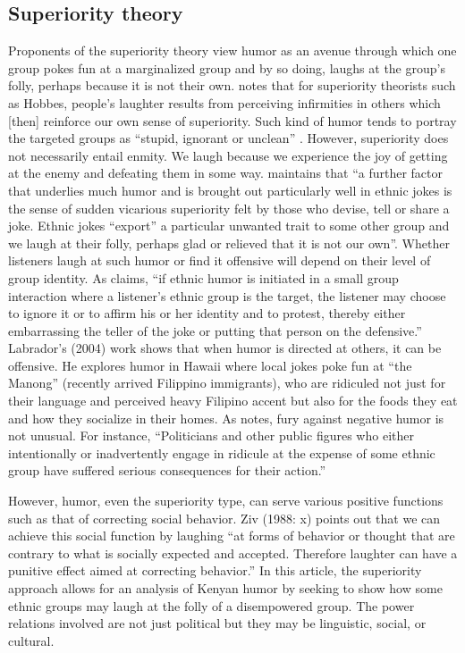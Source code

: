 \documentclass[output=paper]{langsci/langscibook}
\begin{document}
\subsection{Superiority theory}

   Proponents of the superiority theory view humor as an avenue through which one group pokes fun at a marginalized group and by so doing, laughs at the group’s folly, perhaps because it is not their own. \citet[8]{Carroll2014} notes that for superiority theorists such as Hobbes, people’s laughter results from perceiving infirmities in others which [then] reinforce our own sense of superiority. Such kind of humor tends to portray the targeted groups as “stupid, ignorant or unclean” \citep[115]{Apte1985}. However, superiority does not necessarily entail enmity. We laugh because we experience the joy of getting at the enemy and defeating them in some way. \citet[7]{Davies1990} maintains that “a further factor that underlies much humor and is brought out particularly well in ethnic jokes is the sense of sudden vicarious superiority felt by those who devise, tell or share a joke. Ethnic jokes “export” a particular unwanted trait to some other group and we laugh at their folly, perhaps glad or relieved that it is not our own”. Whether listeners laugh at such humor or find it offensive will depend on their level of group identity. As \citet[34]{Apte1987} claims, “if ethnic humor is initiated in a small group interaction where a listener’s ethnic group is the target, the listener may choose to ignore it or to affirm his or her identity and to protest, thereby either embarrassing the teller of the joke or putting that person on the defensive.” Labrador’s (2004) work shows that when humor is directed at others, it can be offensive. He explores humor in Hawaii where local jokes poke fun at “the Manong” (recently arrived Filippino immigrants), who are ridiculed not just for their language and perceived heavy Filipino accent but also for the foods they eat and how they socialize in their homes. As \citet[35]{Apte1987} notes, fury against negative humor is not unusual. For instance, “Politicians and other public figures who either intentionally or inadvertently engage in ridicule at the expense of some ethnic group have suffered serious consequences for their action.”

   However, humor, even the superiority type, can serve various positive functions such as that of correcting social behavior. Ziv (1988: x) points out that we can achieve this social function by laughing “at forms of behavior or thought that are contrary to what is socially expected and accepted. Therefore laughter can have a punitive effect aimed at correcting behavior.” In this article, the superiority approach allows for an analysis of Kenyan humor by seeking to show how some ethnic groups may laugh at the folly of a disempowered group. The power relations involved are not just political but they may be linguistic, social, or cultural. 
\end{document}
